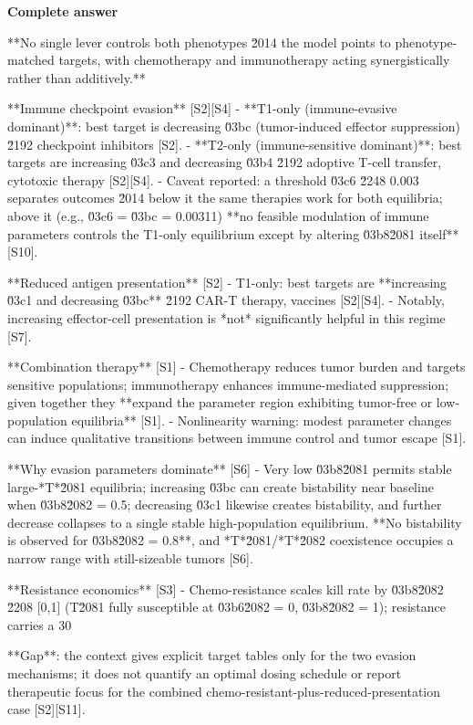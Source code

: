 \documentclass[10pt]{article}
\begin{document}
\textbf{Complete answer}
\begin{AnswerText}
**No single lever controls both phenotypes \u2014 the model points to phenotype-matched targets, with chemotherapy and immunotherapy acting synergistically rather than additively.**

**Immune checkpoint evasion** [S2][S4]
- **T1-only (immune-evasive dominant)**: best target is decreasing \u03bc (tumor-induced effector suppression) \u2192 checkpoint inhibitors [S2].
- **T2-only (immune-sensitive dominant)**: best targets are increasing \u03c3 and decreasing \u03b4 \u2192 adoptive T-cell transfer, cytotoxic therapy [S2][S4].
- Caveat reported: a threshold \u03c6 \u2248 0.003 separates outcomes \u2014 below it the same therapies work for both equilibria; above it (e.g., \u03c6 = \u03bc = 0.00311) **no feasible modulation of immune parameters controls the T1-only equilibrium except by altering \u03b8\u2081 itself** [S10].

**Reduced antigen presentation** [S2]
- T1-only: best targets are **increasing \u03c1 and decreasing \u03bc** \u2192 CAR-T therapy, vaccines [S2][S4].
- Notably, increasing effector-cell presentation is *not* significantly helpful in this regime [S7].

**Combination therapy** [S1]
- Chemotherapy reduces tumor burden and targets sensitive populations; immunotherapy enhances immune-mediated suppression; given together they **expand the parameter region exhibiting tumor-free or low-population equilibria** [S1].
- Nonlinearity warning: modest parameter changes can induce qualitative transitions between immune control and tumor escape [S1].

**Why evasion parameters dominate** [S6]
- Very low \u03b8\u2081 permits stable large-*T*\u2081 equilibria; increasing \u03bc can create bistability near baseline when \u03b8\u2082 = 0.5; decreasing \u03c1 likewise creates bistability, and further decrease collapses to a single stable high-population equilibrium. **No bistability is observed for \u03b8\u2082 = 0.8**, and *T*\u2081/*T*\u2082 coexistence occupies a narrow range with still-sizeable tumors [S6].

**Resistance economics** [S3]
- Chemo-resistance scales kill rate by \u03b8\u2082 \u2208 [0,1] (T\u2081 fully susceptible at \u03b6\u2082 = 0, \u03b8\u2082 = 1); resistance carries a 30%

**Gap**: the context gives explicit target tables only for the two evasion mechanisms; it does not quantify an optimal dosing schedule or report therapeutic focus for the combined chemo-resistant-plus-reduced-presentation case [S2][S11].
\end{AnswerText}
\end{document}

